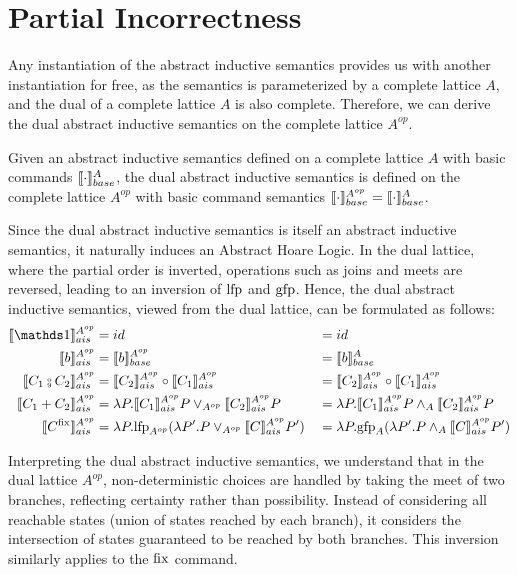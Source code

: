 \documentclass[
  10pt,       %
  twoside,    %
  a4paper,    %
  english,    %
  tikz,       %
  openright,  %
]{book}
\begin{document}
\section{Partial Incorrectness}
\label{chp:partial-incorrectness}

Any instantiation of the abstract inductive semantics provides us with another
instantiation for free, as the semantics is parameterized by a complete lattice
\( A \), and the dual of a complete lattice \( A \) is also complete. Therefore,
we can derive the dual abstract inductive semantics on the complete lattice
\( A^{op} \).

\begin{definition}
  Given an abstract inductive semantics defined on a complete lattice \( A \)
  with basic commands \( \llbracket \cdot \rrbracket_{base}^A \), the dual abstract inductive
  semantics is defined on the complete lattice \( A^{op} \) with basic command
  semantics \( \llbracket \cdot \rrbracket_{base}^{A^{op}} = \llbracket \cdot \rrbracket_{base}^A \).
\end{definition}

Since the dual abstract inductive semantics is itself an abstract inductive
semantics, it naturally induces an Abstract Hoare Logic. In the dual lattice,
where the partial order is inverted, operations such as joins and meets are
reversed, leading to an inversion of \( \mathrm{lfp} \) and \( \mathrm{gfp} \). Hence, the dual
abstract inductive semantics, viewed from the dual lattice, can be formulated
as follows:
\begin{align*}
  \asem[A^{op}]{\sskip}        &= id &&= id \\
  \asem[A^{op}]{b}             &= \bsem{b}^{A^{op}} &&= \bsem{b}^A \\
  \asem[A^{op}]{C_1 \fcmp C_2} &= \asem[A^{op}]{C_2} \circ \asem[A^{op}]{C_1} &&= \asem[A^{op}]{C_2} \circ \asem[A^{op}]{C_1} \\
  \asem[A^{op}]{C_1 + C_2}     &= \lambda P . \asem[A^{op}]{C_1} P \join_{A^{op}} \asem[A^{op}]{C_2} P &&= \lambda P . \asem[A^{op}]{C_1} P \meet_A \asem[A^{op}]{C_2} P \\
  \asem[A^{op}]{C^\fix}        &= \lambda P . \lfp_{A^{op}}(\lambda P'. P \join_{A^{op}} \asem[A^{op}]{C} P') &&= \lambda P . \gfp_{A}(\lambda P'. P \meet_A \asem[A^{op}]{C} P')
\end{align*}

Interpreting the dual abstract inductive semantics, we understand that in the
dual lattice \( A^{op} \), non-deterministic choices are handled by taking the
meet of two branches, reflecting certainty rather than possibility. Instead of
considering all reachable states (union of states reached by each branch), it
considers the intersection of states guaranteed to be reached by both branches.
This inversion similarly applies to the \( \mathrm{fix} \) command.
\end{document}
